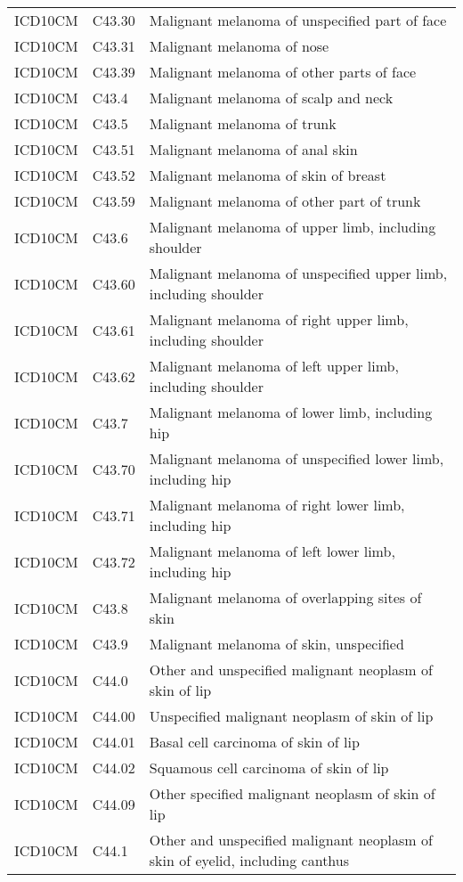 \begin{table}[ht]
\begin{tabular}{lll}
  ICD10CM & C43.30 & Malignant melanoma of unspecified part of face \\ 
  ICD10CM & C43.31 & Malignant melanoma of nose \\ 
  ICD10CM & C43.39 & Malignant melanoma of other parts of face \\ 
  ICD10CM & C43.4 & Malignant melanoma of scalp and neck \\ 
  ICD10CM & C43.5 & Malignant melanoma of trunk \\ 
  ICD10CM & C43.51 & Malignant melanoma of anal skin \\ 
  ICD10CM & C43.52 & Malignant melanoma of skin of breast \\ 
  ICD10CM & C43.59 & Malignant melanoma of other part of trunk \\ 
  ICD10CM & C43.6 & Malignant melanoma of upper limb, including shoulder \\ 
  ICD10CM & C43.60 & Malignant melanoma of unspecified upper limb, including shoulder \\ 
  ICD10CM & C43.61 & Malignant melanoma of right upper limb, including shoulder \\ 
  ICD10CM & C43.62 & Malignant melanoma of left upper limb, including shoulder \\ 
  ICD10CM & C43.7 & Malignant melanoma of lower limb, including hip \\ 
  ICD10CM & C43.70 & Malignant melanoma of unspecified lower limb, including hip \\ 
  ICD10CM & C43.71 & Malignant melanoma of right lower limb, including hip \\ 
  ICD10CM & C43.72 & Malignant melanoma of left lower limb, including hip \\ 
  ICD10CM & C43.8 & Malignant melanoma of overlapping sites of skin \\ 
  ICD10CM & C43.9 & Malignant melanoma of skin, unspecified \\ 
  ICD10CM & C44.0 & Other and unspecified malignant neoplasm of skin of lip \\ 
  ICD10CM & C44.00 & Unspecified malignant neoplasm of skin of lip \\ 
  ICD10CM & C44.01 & Basal cell carcinoma of skin of lip \\ 
  ICD10CM & C44.02 & Squamous cell carcinoma of skin of lip \\ 
  ICD10CM & C44.09 & Other specified malignant neoplasm of skin of lip \\ 
  ICD10CM & C44.1 & Other and unspecified malignant neoplasm of skin of eyelid, including canthus \\ 

\end{tabular}
\end{table}
